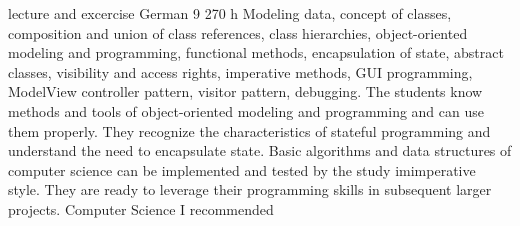 {lecture and excercise}
{German}
{9}
{270 h}
{Modeling data, concept of classes, composition and union of class references, class hierarchies, object-oriented modeling and programming, functional methods, encapsulation of state, abstract classes, visibility and access rights, imperative methods, GUI programming, ModelView controller pattern, visitor pattern, debugging.}
{The students know methods and tools of object-oriented modeling and programming and can use them properly. They recognize the characteristics of stateful programming and understand the need to encapsulate state. Basic algorithms and data structures of computer science can be implemented and tested by the study imimperative style. They are ready to leverage their programming skills in subsequent larger projects.}
{Computer Science I recommended}
